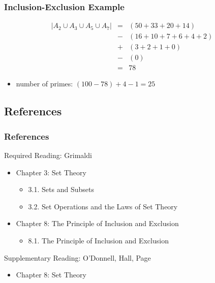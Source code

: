 \documentclass[dvipsnames]{beamer}
\begin{document}
\begin{frame}
  \frametitle{Inclusion-Exclusion Example}

  \begin{example}
    \begin{eqnarray*}
      |A_2 \cup A_3 \cup A_5 \cup A_7| & = & (50 + 33 + 20 +14)\\
                                       & - & (16 + 10 + 7 + 6 + 4 + 2)\\
                                       & + & (3 + 2 + 1 + 0)\\
                                       & - & (0)\\
                                       & = & 78
    \end{eqnarray*}

    \pause
    \begin{itemize}
      \item number of primes: $(100 - 78) + 4 - 1 = 25$
    \end{itemize}
  \end{example}
\end{frame}

\subsection*{References}

\begin{frame}
  \frametitle{References}

  \begin{block}{Required Reading: Grimaldi}
    \begin{itemize}
      \item Chapter 3: Set Theory
      \begin{itemize}
        \item 3.1. \alert{Sets and Subsets}
        \item 3.2. \alert{Set Operations and the Laws of Set Theory}
      \end{itemize}

      \item Chapter 8: The Principle of Inclusion and Exclusion
      \begin{itemize}
        \item 8.1. \alert{The Principle of Inclusion and Exclusion}
      \end{itemize}
    \end{itemize}
  \end{block}

  \begin{block}{Supplementary Reading: O'Donnell, Hall, Page}
    \begin{itemize}
      \item Chapter 8: Set Theory
    \end{itemize}
  \end{block}
\end{frame}
\end{document}
